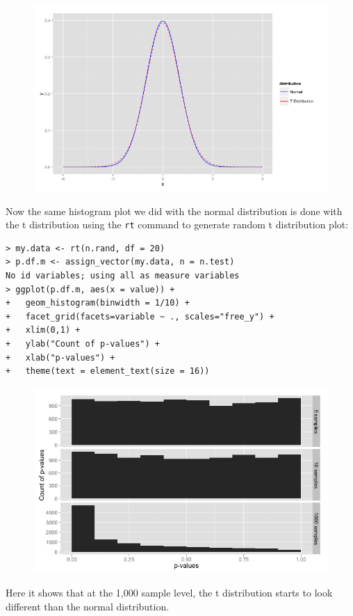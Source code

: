 \documentclass[10pt]{article}
\begin{document}
\begin{figure}[!h]
\includegraphics[scale=0.37]{tDistLinePlot.png}
\centering
\end{figure}
Now the same histogram plot we did with the normal distribution is done with the t distribution using the \verb|rt| command to generate random t distribution plot:
\begin{verbatim}
> my.data <- rt(n.rand, df = 20)
> p.df.m <- assign_vector(my.data, n = n.test)
No id variables; using all as measure variables
> ggplot(p.df.m, aes(x = value)) + 
+   geom_histogram(binwidth = 1/10) + 
+   facet_grid(facets=variable ~ ., scales="free_y") + 
+   xlim(0,1) +
+   ylab("Count of p-values") +
+   xlab("p-values") +
+   theme(text = element_text(size = 16))
\end{verbatim}
\begin{figure}[!h]
\includegraphics[scale=0.37]{tDistHistPlot.png}
\centering
\end{figure}
Here it shows that at the 1,000 sample level, the t distribution starts to look different than the normal distribution.\\
\end{document}
